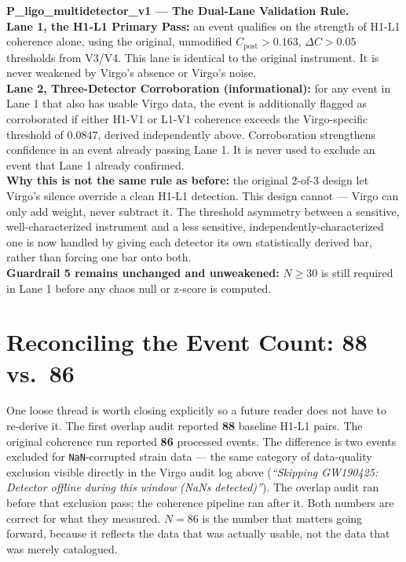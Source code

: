 \documentclass[11pt, letterpaper, openany]{book}
\begin{document}
\begin{predictionbox}
\textbf{P\_ligo\_multidetector\_v1 --- The Dual-Lane Validation Rule.}\\[0.5em]
\textbf{Lane 1, the H1-L1 Primary Pass:} an event qualifies on the
strength of H1-L1 coherence alone, using the original, unmodified
$C_\text{post}>0.163$, $\Delta C>0.05$ thresholds from V3/V4. This lane
is identical to the original instrument. It is never weakened by Virgo's
absence or Virgo's noise.\\[0.5em]
\textbf{Lane 2, Three-Detector Corroboration (informational):} for any
event in Lane 1 that also has usable Virgo data, the event is
additionally flagged as corroborated if either H1-V1 or L1-V1 coherence
exceeds the Virgo-specific threshold of $0.0847$, derived independently
above. Corroboration strengthens confidence in an event already passing
Lane 1. It is never used to exclude an event that Lane 1 already
confirmed.\\[0.5em]
\textbf{Why this is not the same rule as before:} the original 2-of-3
design let Virgo's silence override a clean H1-L1 detection. This design
cannot --- Virgo can only add weight, never subtract it. The threshold
asymmetry between a sensitive, well-characterized instrument and a less
sensitive, independently-characterized one is now handled by giving each
detector its own statistically derived bar, rather than forcing one bar
onto both.\\[0.5em]
\textbf{Guardrail 5 remains unchanged and unweakened:} $N\geq30$ is still
required in Lane 1 before any chaos null or z-score is computed.
\end{predictionbox}

\section{Reconciling the Event Count: 88 vs.\ 86}

One loose thread is worth closing explicitly so a future reader does not
have to re-derive it. The first overlap audit reported \textbf{88}
baseline H1-L1 pairs. The original coherence run reported \textbf{86}
processed events. The difference is two events excluded for
\texttt{NaN}-corrupted strain data --- the same category of data-quality
exclusion visible directly in the Virgo audit log above
(\textit{``Skipping GW190425: Detector offline during this window
(NaNs detected)''}). The overlap audit ran before that exclusion pass;
the coherence pipeline ran after it. Both numbers are correct for what
they measured. $N=86$ is the number that matters going forward, because
it reflects the data that was actually usable, not the data that was
merely catalogued.
\end{document}
